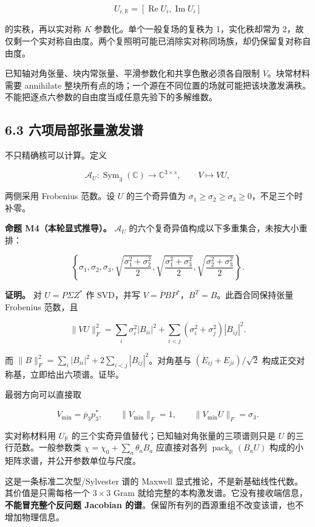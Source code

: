 \documentclass[11pt,a4paper]{article}
\begin{document}
\[
U_{i,\mathbb R}=[\operatorname{Re}U_i,\operatorname{Im}U_i]
\]

的实秩，再以实对称 \(K\) 参数化。单个一般复场的复秩为 1，实化秩却常为
2，故仅剩一个实对称自由度。两个复照明可能已消除实对称同场族，却仍保留复对称自由度。

已知轴对角张量、块内常张量、平滑参数化和共享色散必须各自限制
\(V\)。块常材料需要 annihilate
整块所有点的场；一个源在不同位置的场就可能把该块激发满秩。不能把逐点六参数的自由度当成任意先验下的多解维数。

\hypertarget{ux516dux9879ux5c40ux90e8ux5f20ux91cfux6fc0ux53d1ux8c31}{%
\subsection{6.3
六项局部张量激发谱}\label{ux516dux9879ux5c40ux90e8ux5f20ux91cfux6fc0ux53d1ux8c31}}

不只精确核可以计算。定义

\[
\mathcal A_U:\operatorname{Sym}_3(\mathbb C)\longrightarrow
\mathbb C^{3\times s},\qquad V\longmapsto VU,
\]

两侧采用 Frobenius 范数。设 \(U\) 的三个奇异值为
\(\sigma_1\ge\sigma_2\ge\sigma_3\ge0\)，不足三个时补零。

\textbf{命题 M4（本轮显式推导）。} \(\mathcal A_U\)
的六个复奇异值构成以下多重集合，未按大小重排：

\[
\boxed{\left\{\sigma_1,\sigma_2,\sigma_3,
\sqrt{\frac{\sigma_1^2+\sigma_2^2}{2}},
\sqrt{\frac{\sigma_1^2+\sigma_3^2}{2}},
\sqrt{\frac{\sigma_2^2+\sigma_3^2}{2}}\right\}.}
\]

\textbf{证明。} 对 \(U=P\Sigma Z^*\) 作 SVD，并写
\(V=\overline P B P^*\)，\(B^T=B\)。此酉合同保持张量 Frobenius 范数，且

\[
\|VU\|_F^2
=\sum_i\sigma_i^2|B_{ii}|^2
+\sum_{i<j}(\sigma_i^2+\sigma_j^2)|B_{ij}|^2.
\]

而 \(\|B\|_F^2=\sum_i|B_{ii}|^2+2\sum_{i<j}|B_{ij}|^2\)。对角基与
\((E_{ij}+E_{ji})/\sqrt2\) 构成正交对称基，立即给出六项谱。证毕。

最弱方向可以直接取

\[
V_{\min}=\overline p_3p_3^*,\qquad
\|V_{\min}\|_F=1,\qquad\|V_{\min}U\|_F=\sigma_3.
\]

实对称材料用 \(U_{\mathbb R}\)
的三个实奇异值替代；已知轴对角张量的三项谱则只是 \(U\)
的三行范数。一般参数类 \(\chi=\chi_0+\sum_a\theta_aB_a\) 应直接对各列
\(\operatorname{pack}_{\mathbb R}(B_aU)\)
构成的小矩阵求谱，并公开参数单位与尺度。

这是一条标准二次型/Sylvester 谱的 Maxwell
显式推论，不是新基础线性代数。其价值是只需每格一个 \(3\times3\) Gram
就给完整的本构激发谱。它没有接收端信息，\textbf{不能冒充整个反问题
Jacobian 的谱}。保留所有列的酉源重组不改变该谱，也不增加物理信息。
\end{document}
